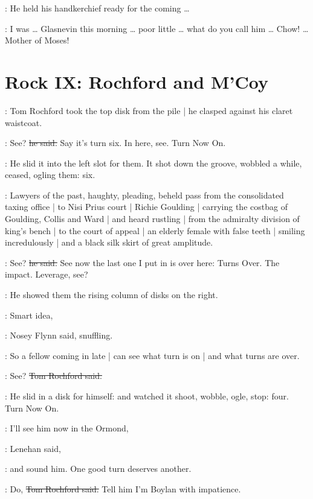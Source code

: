 :
He held his handkerchief ready for the coming \ldots

\lambert:
I was \ldots
Glasnevin this morning \ldots
poor little \ldots
what do you call him \ldots
Chow! \ldots
Mother of Moses!


\section*{Rock IX: Rochford and M'Coy}


:
Tom Rochford took the top disk from the pile |
he clasped against his claret waistcoat.

\rochford:
See?
\sout{he said.}
Say it's turn six.
In here, see.
Turn Now On.

:
He slid it into the left slot for them.
It shot down the groove,
wobbled a while,
ceased,
ogling them:
six.

\begin{interject}
    :
    Lawyers of the past, haughty, pleading,
    beheld pass from the consolidated taxing office |
    to Nisi Prius court |
    Richie Goulding |
    carrying the costbag of Goulding, Collis and Ward |
    and heard rustling |
    from the admiralty division of king's bench |
    to the court of appeal |
    an elderly female with false teeth |
    smiling incredulously |
    and a black silk skirt of great amplitude.
\end{interject}

\rochford:
See?
\sout{he said.}
See now the last one I put in is over here:
Turns Over.
The impact. Leverage, see?

:
He showed them the rising column of disks on the right.

\nosey:
Smart idea,

:
Nosey Flynn said, snuffling.%

\nosey:
So a fellow coming in late |
can see what turn is on |
and what turns are over.

\rochford:
See?
\sout{Tom Rochford said.}

:
He slid in a disk for himself:
and watched it
shoot,
wobble,
ogle,
stop:
four.
Turn Now On.

\lenehan:
I'll see him now in the Ormond,

:
Lenehan said,

\lenehan:
and sound him.
One good turn deserves another.

\rochford:
Do,
\sout{Tom Rochford said.}
Tell him I'm Boylan with impatience.

